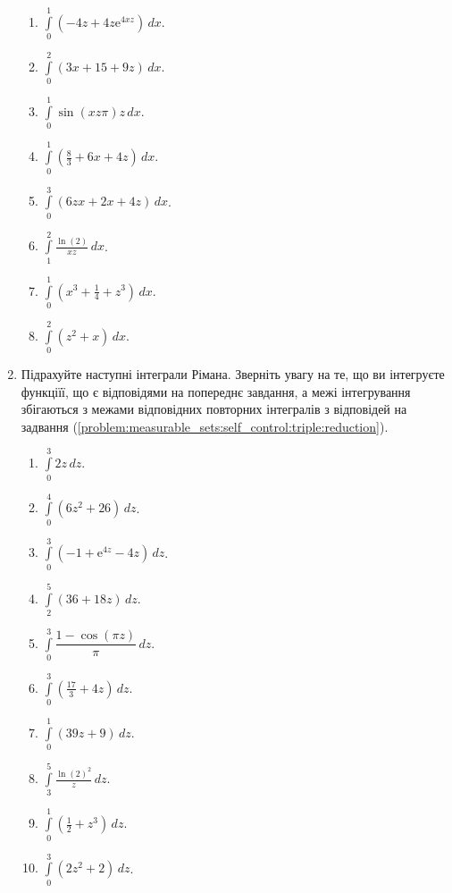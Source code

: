 \begin{enumerate}
\begin{multicols}{2}
\begin{enumerate}[label*=\arabic*.]
        \item $\int\limits_0^1 \left(-4 z+4 z {\mathrm e}^{4 x z}\right) \,dx$.
        \item $\int\limits_0^2 \left(3 x+15+9 z\right) \,dx$.
        \item $\int\limits_0^1 {\sin}{\left(x z \pi \right)} {z} \,dx$.
        \item $\int\limits_0^1 \left(\frac{8}{3}+6 x+4 z\right) \,dx$.
        \item $\int\limits_0^3 \left(6 z x+2 x+4 z\right) \,dx$.
        \item $\int\limits_1^2 \frac{\ln\! \left(2\right)}{x z} \,dx$.
        \item $\int\limits_0^1 \left({x^{3}+\frac{1}{4}+z^{3}}\right) \,dx$.
        \item $\int\limits_0^2 \left(z^{2}+x\right) \,dx$.
    \end{enumerate}
\end{multicols}
\item\label{problem:measurable_sets:self_control:triple:outer} Підрахуйте наступні інтеграли Рімана. Зверніть увагу на те, що ви інтегруєте функціїї, що є відповідями на попереднє завдання, а межі інтегрування збігаються з межами відповідних повторних інтегралів з відповідей на задвання (\ref{problem:measurable_sets:self_control:triple:reduction}).
\begin{multicols}{2}
    \begin{enumerate}[label*=\arabic*.]
        \item $\int\limits_0^3 2z \,dz$.
        \item $\int\limits_0^4 \left({6} {z^{2}}{+}{26}\right) \,dz$.
        \item $\int\limits_0^3 \left(-1+{\mathrm e}^{4 z}-4z\right) \,dz$.
        \item $\int\limits_2^5 \left(36 + 18 z\right) \,dz$.
        \item $\int\limits_0^3 \dfrac{1 - \cos\! \left(\pi  z\right)}{\pi} \,dz$.
        \item $\int\limits_0^3\left(\frac{17}{3}+4 z\right) \,dz$.
        \item $\int\limits_0^1 \left({39} {z}{+}{9}\right) \,dz$.
        \item $\int\limits_3^5 \frac{\ln\! \left(2\right)^{2}}{z} \,dz$.
        \item $\int\limits_0^1 \left(\frac{1}{2}+z^{3}\right) \,dz$.
        \item $\int\limits_0^3 \left({2} {z^{2}}{+}{2}\right) \,dz$.
    \end{enumerate}
\end{multicols}
\end{enumerate}
